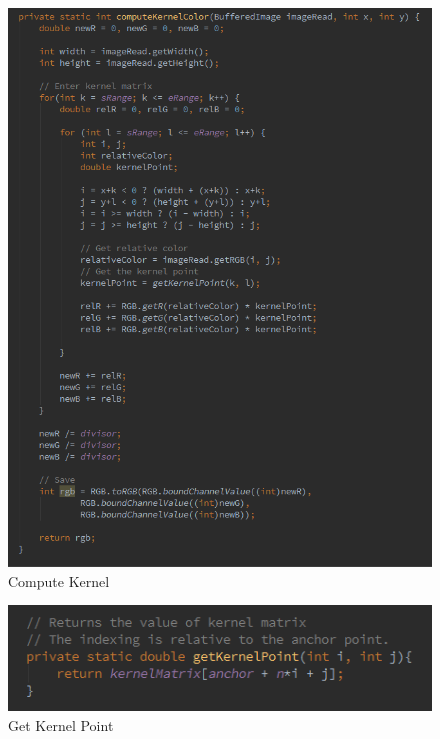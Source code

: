 \documentclass{article}
\begin{document}
%
% 
%
\begin{figure}[H]
\centering

  \includegraphics[width=0.9\linewidth]{res/algorithms/computeKernelColor2.png}
  
\caption{Compute Kernel}
\label{fig:alg_compute_kernel}
\end{figure}




%
% 
%
\begin{figure}[H]
\centering

  \includegraphics[width=0.9\linewidth]{res/algorithms/getKernelPoint.png}
  
\caption{Get Kernel Point}
\label{fig:alg_getKernelPoint}
\end{figure}
\end{document}
